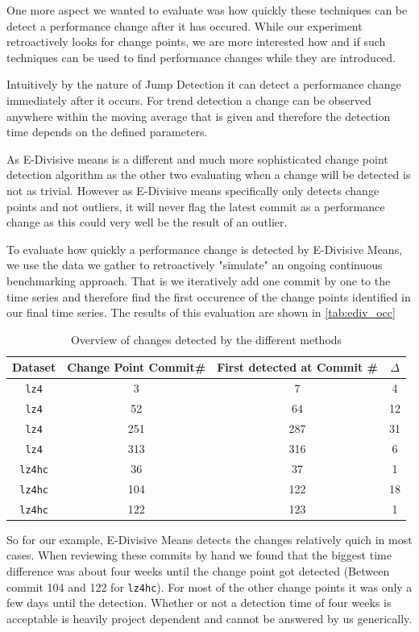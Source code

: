 \documentclass[	runningheads,
				a4paper]{llncs}
\begin{document}
One more aspect we wanted to evaluate was how quickly these techniques can be detect a performance change after it has occured. While our experiment retroactively looks for change points, we are more interested how and if such techniques can be used to find performance changes while they are introduced.

Intuitively by the nature of Jump Detection it can detect a performance change immediately after it occurs. For trend detection a change can be observed anywhere within the moving average that is given and therefore the detection time depends on the defined parameters.

As E-Divisive means is a different and much more sophisticated change point detection algorithm as the other two evaluating when a change will be detected is not as trivial. However as E-Divisive means specifically only detects change points and not outliers, it will never flag the latest commit as a performance change as this could very well be the result of an outlier.

To evaluate how quickly a performance change is detected by E-Divisive Means, we use the data we gather to retroactively "simulate" an ongoing continuous benchmarking approach. That is we iteratively add one commit by one to the time series and therefore find the first occurence of the change points identified in our final time series. The results of this evaluation are shown in \autoref{tab:ediv_occ}

\begin{table}
	\centering
	\begin{tabular}{|c||c|c|c|}
		\hline
		\textbf{Dataset}&\textbf{Change Point Commit\#}&\textbf{First detected at Commit \#}&\textbf{$\Delta$}
		\\\hline\hline
		\texttt{lz4}&3&7&4
		\\\hline
		\texttt{lz4}&52&64&12
		\\\hline
		\texttt{lz4}&251&287&31
		\\\hline
		\texttt{lz4}&313&316&6
		\\\hline
		\texttt{lz4hc}&36&37&1
		\\\hline
		\texttt{lz4hc}&104&122&18
		\\\hline
		\texttt{lz4hc}&122&123&1
		\\\hline
	\end{tabular}
	\caption{Overview of changes detected by the different methods}
\end{table}

So for our example, E-Divisive Means detects the changes relatively quich in most cases. When reviewing these commits by hand we found that the biggest time difference was about four weeks until the change point got detected (Between commit 104 and 122 for \texttt{lz4hc}). For most of the other change points it was only a few days until the detection. Whether or not a detection time of four weeks is acceptable is heavily project dependent and cannot be answered by us generically.
\end{document}
